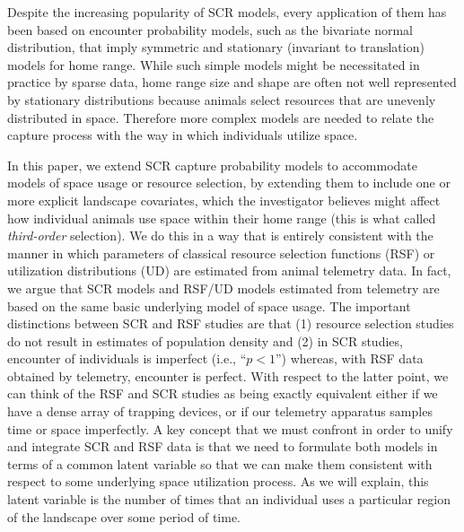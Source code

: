 \documentclass[12pt]{article}
\begin{document}
Despite the increasing popularity of SCR models, every
application of them has been based on encounter probability
models, such as the bivariate normal distribution, that imply
symmetric and stationary (invariant to translation) models for home range.
While such simple models might be necessitated in practice by sparse
data, %
home range size and shape are often not well represented by stationary
distributions because animals select
resources %
that %
are unevenly distributed in space. Therefore %
more complex models are needed to relate the capture %
process with the way in which individuals utilize
space. %

In this paper, we extend SCR capture probability models to accommodate
models of space usage or resource selection, by extending them to
include one or more explicit landscape covariates, which the
investigator believes might affect how individual animals use space
within their home range (this is what \citep{johnson:1980} called {\it
  third-order} selection). We do this in a way that is entirely
consistent with the manner in which parameters of classical resource
selection functions (RSF) \citep{manly_etal:2002} or utilization
distributions (UD) \citep{worton:1989, fieberg:2005, fieberg:2007} are
estimated from animal telemetry data.  In fact, we argue that SCR
models and RSF/UD models estimated from telemetry are based on the
same basic underlying model of space usage. The important distinctions
between SCR and RSF studies are that (1) resource selection studies do
not result in estimates of population density and (2) in SCR studies,
encounter of individuals is imperfect (i.e., ``$p<1$'') whereas, with
RSF data obtained by telemetry, encounter is perfect.  With respect to
the latter point, we can think of the RSF and SCR studies as being
exactly equivalent either if we have a dense array of trapping
devices, or if our telemetry apparatus %
samples time or space imperfectly.
A key concept that we must confront in order to unify and integrate
SCR and RSF data is that we need to formulate both models in terms of
a common latent variable so that we can make them consistent with
respect to some underlying space utilization process. As we will
explain, this latent variable is the number of times that an
individual uses a particular region %
of the landscape over some period of time.
\end{document}
